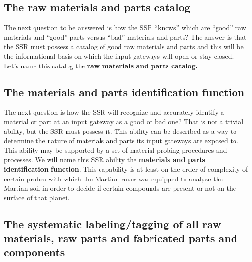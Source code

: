 \subsection[The raw materials and parts catalog]{The raw materials and
parts catalog}

\hypertarget{RefHeading3054306210128}{}The next question to be answered
is how the SSR “knows” which are “good” raw materials and “good” parts
versus “bad” materials and parts? The answer is that the SSR must
possess a catalog of good raw materials and parts and this will be the
informational basis on which the input gateways will open or stay
closed. Let’s name this catalog the \textbf{raw materials and parts
catalog.}

\subsection[The materials and parts identification function]{The
materials and parts identification function}

\hypertarget{RefHeading3056306210128}{}The next question is how the SSR
will recognize and accurately identify a material or part at an input
gateway as a good or bad one? That is not a trivial ability, but the
SSR must possess it. This ability can be described as a way to
determine the nature of materials and parts its input gateways are
exposed to. This ability may be supported by a set of material probing
procedures and processes. We will name this SSR ability the
\textbf{materials and parts identification function}. This capability
is at least on the order of complexity of certain probes with which the
Martian rover was equipped to analyze the Martian soil in order to
decide if certain compounds are present or not on the surface of that
planet.

\subsection[The systematic labeling/tagging of all raw materials, raw
parts and fabricated parts and components]{The systematic
labeling/tagging of all raw materials, raw parts and fabricated parts
and components}

